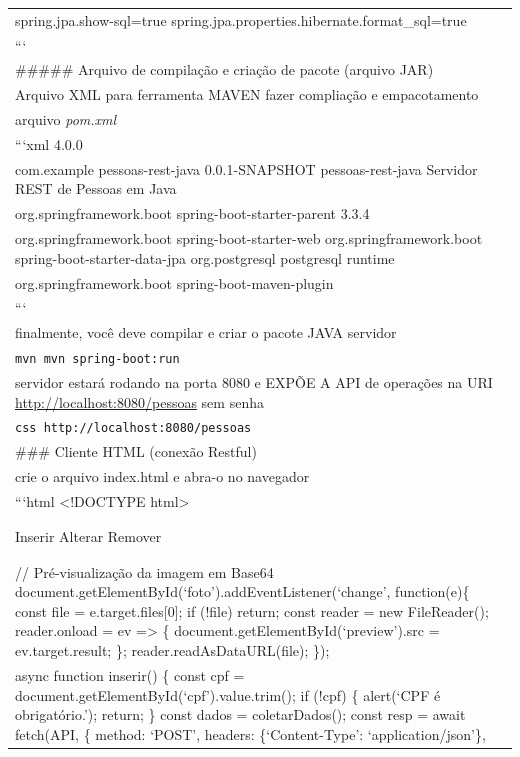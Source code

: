 \documentclass[
]{book}
\begin{document}
\begin{longtable}[]{@{}
  >{\raggedright\arraybackslash}p{}@{}}
spring.jpa.show-sql=true
spring.jpa.properties.hibernate.format\_sql=true \\
``` \\
\#\#\#\#\# Arquivo de compilação e criação de pacote (arquivo JAR) \\
Arquivo XML para ferramenta MAVEN fazer compliação e empacotamento \\
arquivo \emph{pom.xml} \\
```xml
4.0.0 \\
com.example
pessoas-rest-java
0.0.1-SNAPSHOT
pessoas-rest-java
Servidor REST de Pessoas em Java \\
org.springframework.boot
spring-boot-starter-parent
3.3.4
 \\
org.springframework.boot
spring-boot-starter-web
org.springframework.boot
spring-boot-starter-data-jpa
org.postgresql
postgresql
runtime
 \\
org.springframework.boot
spring-boot-maven-plugin
 \\
``` \\
finalmente, você deve compilar e criar o pacote JAVA servidor \\
\texttt{mvn\ mvn\ spring-boot:run} \\
servidor estará rodando na porta 8080 e EXPÕE A API de operações na URI \url{http://localhost:8080/pessoas} sem senha \\
\texttt{css\ http://localhost:8080/pessoas} \\
\#\#\# Cliente HTML (conexão Restful) \\
crie o arquivo index.html e abra-o no navegador \\
```html
\textless!DOCTYPE html\textgreater{} \\
 \\
 \\
Inserir
Alterar
Remover \\
 \\
 \\
// Pré-visualização da imagem em Base64
document.getElementById(`foto').addEventListener(`change', function(e)\{
const file = e.target.files{[}0{]};
if (!file) return;
const reader = new FileReader();
reader.onload = ev =\textgreater{} \{
document.getElementById(`preview').src = ev.target.result;
\};
reader.readAsDataURL(file);
\}); \\
async function inserir() \{
const cpf = document.getElementById(`cpf').value.trim();
if (!cpf) \{ alert(`CPF é obrigatório.'); return; \}
const dados = coletarDados();
const resp = await fetch(API, \{
method: `POST',
headers: \{`Content-Type': `application/json'\},

\end{longtable}
\end{document}
